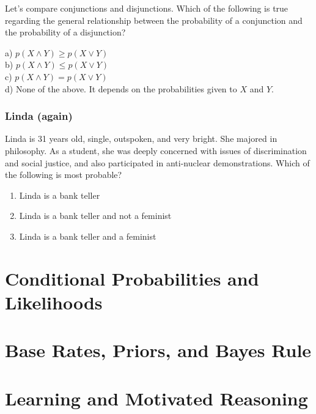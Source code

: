 \documentclass[]{tufte-book}
\providecommand{\tightlist}{%
  \setlength{\itemsep}{0pt}\setlength{\parskip}{0pt}}
\begin{document}
Let's compare conjunctions and disjunctions. Which of the following is true regarding the general relationship between the probability of a conjunction and the probability of a disjunction?

a) \(p(X\wedge Y)\geq p(X\vee Y)\)\\
b) \(p(X\wedge Y)\leq p(X\vee Y)\)\\
c) \(p(X\wedge Y) = p(X\vee Y)\)\\
d) None of the above. It depends on the probabilities given to \(X\) and \(Y\).

\hypertarget{linda-again}{%
\subsection{Linda (again)}\label{linda-again}}

Linda is 31 years old, single, outspoken, and very bright. She majored in philosophy. As a student, she was deeply concerned with issues of discrimination and social justice, and also participated in anti-nuclear demonstrations. Which of the following is most probable?

\begin{enumerate}
\def\labelenumi{\arabic{enumi}.}
\tightlist
\item
  Linda is a bank teller
\item
  Linda is a bank teller and not a feminist
\item
  Linda is a bank teller and a feminist
\end{enumerate}

\hypertarget{conditional-probabilities-and-likelihoods}{%
\chapter{Conditional Probabilities and Likelihoods}\label{conditional-probabilities-and-likelihoods}}

\hypertarget{base-rates-priors-and-bayes-rule}{%
\chapter{Base Rates, Priors, and Bayes Rule}\label{base-rates-priors-and-bayes-rule}}

\hypertarget{learning-and-motivated-reasoning}{%
\chapter{Learning and Motivated Reasoning}\label{learning-and-motivated-reasoning}}
\end{document}
